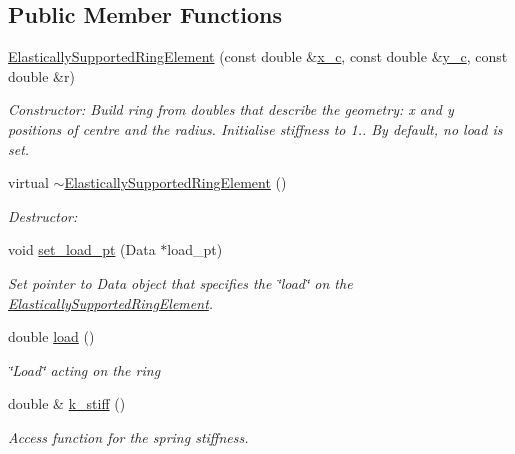 \subsection*{Public Member Functions}
\begin{DoxyCompactItemize}
\item 
\hyperlink{classoomph_1_1ElasticallySupportedRingElement_a7e68f18d76acb6297405ca2a38b64898}{Elastically\+Supported\+Ring\+Element} (const double \&\hyperlink{classoomph_1_1GeneralCircle_a9c84564d8239bd8b4a2b28649638dd4a}{x\+\_\+c}, const double \&\hyperlink{classoomph_1_1GeneralCircle_afa91b6356920d73e05f81d6e7aaf0bf7}{y\+\_\+c}, const double \&r)
\begin{DoxyCompactList}\small\item\em Constructor\+: Build ring from doubles that describe the geometry\+: x and y positions of centre and the radius. Initialise stiffness to 1.. By default, no load is set. \end{DoxyCompactList}\item 
virtual \hyperlink{classoomph_1_1ElasticallySupportedRingElement_a2b3fd2a41155a9d34ab0f43aa8a5deab}{$\sim$\+Elastically\+Supported\+Ring\+Element} ()
\begin{DoxyCompactList}\small\item\em Destructor\+: \end{DoxyCompactList}\item 
void \hyperlink{classoomph_1_1ElasticallySupportedRingElement_ac1c967080f2a4e6143bcffdcdbc1d735}{set\+\_\+load\+\_\+pt} (Data $\ast$load\+\_\+pt)
\begin{DoxyCompactList}\small\item\em Set pointer to Data object that specifies the \char`\"{}load\char`\"{} on the \hyperlink{classoomph_1_1ElasticallySupportedRingElement}{Elastically\+Supported\+Ring\+Element}. \end{DoxyCompactList}\item 
double \hyperlink{classoomph_1_1ElasticallySupportedRingElement_a636b98cd51286298efff1e89cd2c1c4f}{load} ()
\begin{DoxyCompactList}\small\item\em \char`\"{}\+Load\char`\"{} acting on the ring \end{DoxyCompactList}\item 
double \& \hyperlink{classoomph_1_1ElasticallySupportedRingElement_a660b5abfdc353e41848d00617b6ba434}{k\+\_\+stiff} ()
\begin{DoxyCompactList}\small\item\em Access function for the spring stiffness. \end{DoxyCompactList}\item 

\end{DoxyCompactItemize}
